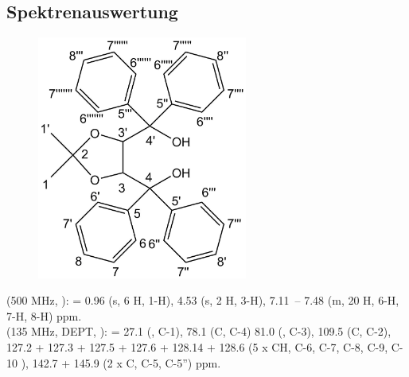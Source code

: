 \documentclass[12pt]{article}
\begin{document}
\begin{onehalfspace}
\section{Spektrenauswertung}

\begin{figure}[!htbp]
   \centering
\includegraphics[width=\textwidth,height=8cm,keepaspectratio]{auswertung.png}
\end{figure}

\noindent
\textbf{} (500 MHz, ): \sffamily \ce{$\delta$} =
0.96 (s, 6 H, 1-H),
4.53 (s, 2 H, 3-H),
7.11~– 7.48 (m, 20 H, 6-H, 7-H, 8-H) ppm. \\
\noindent
\textbf{} (135 MHz, DEPT, ): \sffamily \ce{$\delta$} =
27.1 (, C-1),
78.1 (C, C-4)
81.0 (, C-3),
109.5 (C, C-2),
127.2 + 127.3 + 127.5 + 127.6 + 128.14 + 128.6 (5 x CH, C-6, C-7, C-8, C-9, C-10 ),
142.7 + 145.9 (2 x C, C-5, C-5'') ppm.


\end{onehalfspace}
\end{document}
